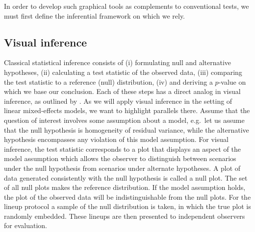 \documentclass[12pt]{article} %
\newcommand{\alnote}[1]{\todo[inline,color=green!40]{#1}} %
\newcommand{\hhnote}[1]{\todo[inline,color=orange!40]{#1}}
\begin{document}
In order to develop such graphical tools as complements to conventional tests, we must first define the inferential framework on which we rely.

\subsection{Visual inference}\label{sec:vi}

Classical statistical inference consists of 
(i) formulating  null and alternative hypotheses,
	(ii) calculating a test statistic of the observed data,
	(iii) comparing the test statistic to a reference (null) distribution,
	(iv) and deriving a $p$-value on which we base our conclusion.
Each of these steps has a direct analog in visual inference, as outlined by \cite{Buja:2009hp}. As we will apply visual inference in the setting of linear mixed-effects models, we want to highlight  parallels there. Assume that  the question of interest involves  some assumption about a model, e.g.~let us assume that the null hypothesis is  homogeneity of residual variance,
while
the alternative hypothesis encompasses any violation of this model assumption. For visual inference, the test statistic corresponds to a plot  that displays an aspect of  the model assumption which allows the observer to distinguish between scenarios under the null hypothesis from scenarios under alternate hypotheses. 
A plot of data generated consistently with the null hypothesis is called a null plot. The set of all null plots makes the reference distribution. 
If the model assumption holds, the plot of the observed data will be indistinguishable from the null plots. 
For the lineup protocol a sample of the null distribution is taken, in which
the true plot is randomly embedded.  These lineups are then presented to independent observers for evaluation. 
\end{document}
